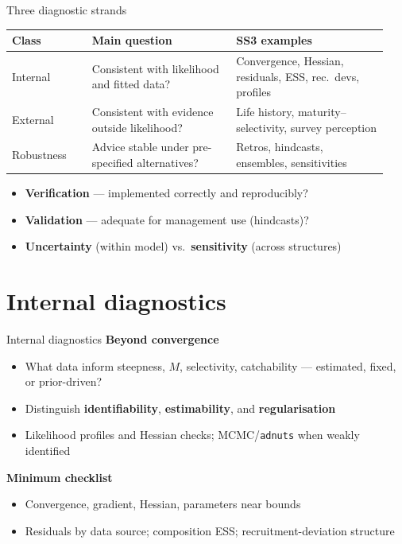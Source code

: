 \documentclass[ignorenonframetext]{beamer}
\begin{document}
\begin{frame}{Three diagnostic strands}
  \small
  \begin{table}
    \centering
    \begin{tabular}{@{}p{0.20\linewidth}p{0.36\linewidth}p{0.38\linewidth}@{}}
      \toprule
      \textbf{Class} & \textbf{Main question} & \textbf{SS3 examples} \\
      \midrule
      Internal &
      Consistent with likelihood and fitted data? &
      Convergence, Hessian, residuals, ESS, rec.\ devs, profiles \\
      External &
      Consistent with evidence outside likelihood? &
      Life history, maturity--selectivity, survey perception \\
      Robustness &
      Advice stable under pre-specified alternatives? &
      Retros, hindcasts, ensembles, sensitivities \\
      \bottomrule
    \end{tabular}
  \end{table}
  \vspace{0.4em}
  \begin{itemize}
    \item \textbf{Verification} --- implemented correctly and reproducibly?
    \item \textbf{Validation} --- adequate for management use (hindcasts)?
    \item \textbf{Uncertainty} (within model) vs.\ \textbf{sensitivity} (across structures)
  \end{itemize}
\end{frame}

\section{Internal diagnostics}

\begin{frame}{Internal diagnostics}
  \textbf{Beyond convergence}
  \begin{itemize}
    \item What data inform steepness, $M$, selectivity, catchability --- estimated, fixed, or prior-driven?
    \item Distinguish \textbf{identifiability}, \textbf{estimability}, and \textbf{regularisation}
    \item Likelihood profiles and Hessian checks; MCMC/\texttt{adnuts} when weakly identified
  \end{itemize}
  \vspace{0.4em}
  \textbf{Minimum checklist}
  \begin{itemize}
    \item Convergence, gradient, Hessian, parameters near bounds
    \item Residuals by data source; composition ESS; recruitment-deviation structure
  \end{itemize}
\end{frame}
\end{document}
